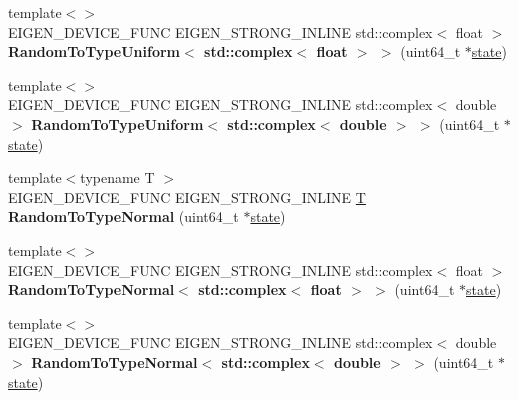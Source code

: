 \begin{DoxyCompactItemize}
\mbox{\label{namespace_eigen_1_1internal_ab03233b73d2d391634fb74f12b266459}} 
{\footnotesize template$<$$>$ }\\E\+I\+G\+E\+N\+\_\+\+D\+E\+V\+I\+C\+E\+\_\+\+F\+U\+NC E\+I\+G\+E\+N\+\_\+\+S\+T\+R\+O\+N\+G\+\_\+\+I\+N\+L\+I\+NE std\+::complex$<$ float $>$ {\bfseries Random\+To\+Type\+Uniform$<$ std\+::complex$<$ float $>$ $>$} (uint64\+\_\+t $\ast$\hyperlink{structstate}{state})
\item 
\mbox{\label{namespace_eigen_1_1internal_a045daee2710da012942aacbb6591f3b0}} 
{\footnotesize template$<$$>$ }\\E\+I\+G\+E\+N\+\_\+\+D\+E\+V\+I\+C\+E\+\_\+\+F\+U\+NC E\+I\+G\+E\+N\+\_\+\+S\+T\+R\+O\+N\+G\+\_\+\+I\+N\+L\+I\+NE std\+::complex$<$ double $>$ {\bfseries Random\+To\+Type\+Uniform$<$ std\+::complex$<$ double $>$ $>$} (uint64\+\_\+t $\ast$\hyperlink{structstate}{state})
\item 
\mbox{\label{namespace_eigen_1_1internal_ac1914699ceb08035d3fd618e5a9d8f42}} 
{\footnotesize template$<$typename T $>$ }\\E\+I\+G\+E\+N\+\_\+\+D\+E\+V\+I\+C\+E\+\_\+\+F\+U\+NC E\+I\+G\+E\+N\+\_\+\+S\+T\+R\+O\+N\+G\+\_\+\+I\+N\+L\+I\+NE \hyperlink{group___sparse_core___module}{T} {\bfseries Random\+To\+Type\+Normal} (uint64\+\_\+t $\ast$\hyperlink{structstate}{state})
\item 
\mbox{\label{namespace_eigen_1_1internal_a53c63ef2cc58325d1ac3384084c9288e}} 
{\footnotesize template$<$$>$ }\\E\+I\+G\+E\+N\+\_\+\+D\+E\+V\+I\+C\+E\+\_\+\+F\+U\+NC E\+I\+G\+E\+N\+\_\+\+S\+T\+R\+O\+N\+G\+\_\+\+I\+N\+L\+I\+NE std\+::complex$<$ float $>$ {\bfseries Random\+To\+Type\+Normal$<$ std\+::complex$<$ float $>$ $>$} (uint64\+\_\+t $\ast$\hyperlink{structstate}{state})
\item 
\mbox{\label{namespace_eigen_1_1internal_a9e83eea3546daeec5e2bd8c87fa8e54b}} 
{\footnotesize template$<$$>$ }\\E\+I\+G\+E\+N\+\_\+\+D\+E\+V\+I\+C\+E\+\_\+\+F\+U\+NC E\+I\+G\+E\+N\+\_\+\+S\+T\+R\+O\+N\+G\+\_\+\+I\+N\+L\+I\+NE std\+::complex$<$ double $>$ {\bfseries Random\+To\+Type\+Normal$<$ std\+::complex$<$ double $>$ $>$} (uint64\+\_\+t $\ast$\hyperlink{structstate}{state})

\end{DoxyCompactItemize}
